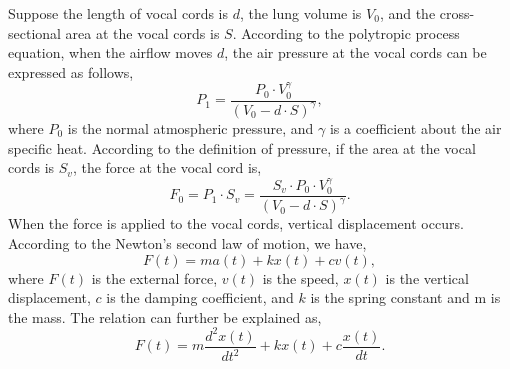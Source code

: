 Suppose the length of vocal cords is $d$, the lung volume is $V_0$, and the cross-sectional area at the vocal cords is $S$. According to the polytropic process equation, when the airflow moves $d$, the air pressure at the vocal cords can be expressed as follows,
\begin{displaymath}
P_1 = \frac{P_0 \cdot V^\gamma_0 }{(V_0 - d \cdot S)^\gamma},
\end{displaymath}
where $P_0$ is the normal atmospheric pressure, and $\gamma$ is a coefficient about the air specific heat. 
According to the definition of pressure, if the area at the vocal cords is $S_v$, the force at the vocal cord is,
\begin{displaymath}
F_0 = P_1 \cdot S_v = \frac{S_v \cdot P_0 \cdot V^\gamma_0 }{(V_0 - d \cdot S)^\gamma}.
\end{displaymath}
When the force is applied to the vocal cords, vertical displacement occurs. 
According to the Newton’s second law of motion, we have,
\begin{displaymath}
F(t) = m a(t) + k x(t) + c v(t),
\end{displaymath}
where $F(t)$ is the external force, $v(t)$ is the speed, $x(t)$ is the vertical displacement, $c$ is the damping coefficient, and $k$ is the spring constant and m is the mass. 
The relation can further be explained as,
\begin{equation}
F(t) = m \frac{d^2 x(t)}{d t^2} + k x(t) + c \frac{x(t)}{d t}.
\label{eq:force}
\end{equation}

